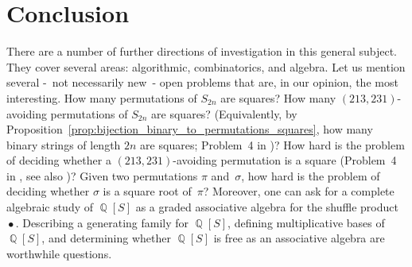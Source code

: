 \documentclass[a4paper]{llncs}
\DeclareMathOperator{\QQ}{\mathbb{Q}}
\DeclareMathOperator{\SHUFFLE}{\bullet}
\begin{document}
\section{Conclusion}
\label{section:Conclusion}

There are a number of further directions of investigation in this
general subject. They cover several areas: algorithmic, combinatorics,
and algebra. Let us mention several -~not necessarily new~- open
problems that are, in our opinion, the most interesting. How many
permutations of $S_{2n}$ are squares? How many $(213,231)$-avoiding
permutations of $S_{2n}$ are squares? (Equivalently, by
Proposition~\ref{prop:bijection_binary_to_permutations_squares},
how many binary strings of length $2n$ are squares; Problem~4
in \cite{Henshall:Rampersad:Shallit:2011})? How hard is the problem of
deciding whether a $(213,231)$-avoiding permutation is a square
(Problem~4 in \cite{Henshall:Rampersad:Shallit:2011},
see also \cite{Buss:Soltys:2014,Rizzi:Vialette:CSR:2013})?
Given two permutations $\pi$ and~$\sigma$, how hard is the problem of
deciding whether $\sigma$ is a square root of~$\pi$?
Moreover, one can ask for a complete algebraic study of
$\QQ[S]$ as a graded associative algebra for the shuffle  product
$\SHUFFLE$. Describing a generating family for $\QQ[S]$, defining
multiplicative bases of $\QQ[S]$, and determining whether $\QQ[S]$ is
free as an associative algebra are worthwhile questions.







\end{document}
